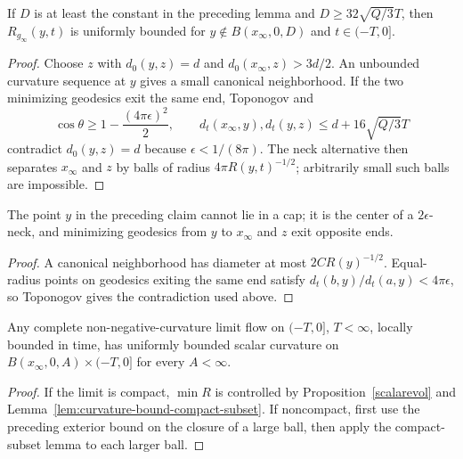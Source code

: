 \begin{claim}
\label{claim:curvature-bound-outside-large-ball}\label{outerbd}

If $D$ is at least the constant in the preceding lemma and
$D\ge32\sqrt{Q/3}T$, then $R_{g_\infty}(y,t)$ is uniformly bounded for
$y\notin B(x_\infty,0,D)$ and $t\in(-T,0]$.
\end{claim}
\begin{proof}
\sketch Choose $z$ with $d_0(y,z)=d$ and $d_0(x_\infty,z)>3d/2$. An
unbounded curvature sequence at $y$ gives a small canonical neighborhood.
If the two minimizing geodesics exit the same end, Toponogov and
$$\cos\theta\ge1-\frac{(4\pi\epsilon)^2}{2},\qquad
d_t(x_\infty,y),d_t(y,z)\le d+16\sqrt{Q/3}T$$
contradict $d_0(y,z)=d$ because $\epsilon<1/(8\pi)$. The neck alternative
then separates $x_\infty$ and $z$ by balls of radius
$4\pi R(y,t)^{-1/2}$; arbitrarily small such balls are impossible.\end{proof}

\begin{claim}
\label{claim:neck-center-opposite-ends}

The point $y$ in the preceding claim cannot lie in a cap; it is the center of
a $2\epsilon$-neck, and minimizing geodesics from $y$ to $x_\infty$ and $z$
exit opposite ends.
\end{claim}
\begin{proof}\sketch A canonical neighborhood has diameter at most
$2CR(y)^{-1/2}$. Equal-radius points on geodesics exiting the same end satisfy
$d_t(b,y)/d_t(a,y)<4\pi\epsilon$, so Toponogov gives the contradiction used
above.\end{proof}

\begin{corollary}
\label{cor:curvature-bound-near-basepoint}\label{ancientlimit}

Any complete non-negative-curvature limit flow on $(-T,0]$, $T<\infty$,
locally bounded in time, has uniformly bounded scalar curvature on
$B(x_\infty,0,A)\times(-T,0]$ for every $A<\infty$.
\end{corollary}
\begin{proof}
\sketch If the limit is compact, $\min R$ is controlled by
Proposition~\ref{scalarevol} and Lemma~\ref{lem:curvature-bound-compact-subset}.
If noncompact, first use the preceding exterior bound on the closure of a
large ball, then apply the compact-subset lemma to each larger ball.\end{proof}

